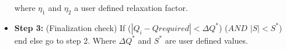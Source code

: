 \begin{itemize}

where $\eta_1$ and $\eta_2$ a user defined relaxation factor. 

\item[]{\bf Step 3:} (Finalization check) If ($|Q_{i}-Q{required}|<\Delta Q^*$) ($AND$ $|S|<S^*$) end else go to step 2. Where $\Delta Q^*$ and $S^*$ are user defined values.
\end{itemize}

\FloatBarrier  




 






